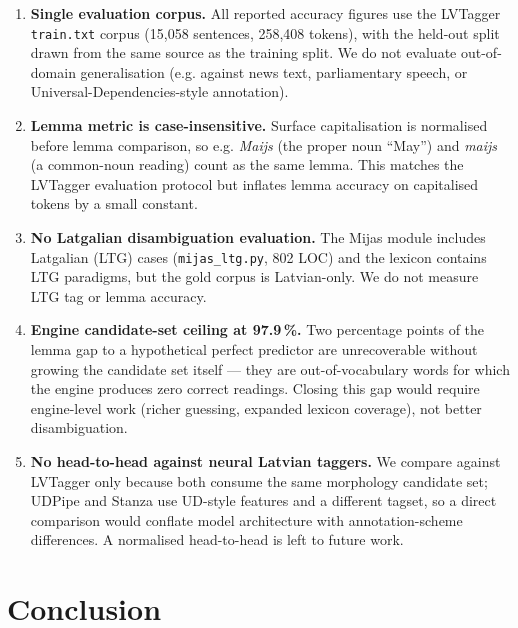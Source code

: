 \documentclass[11pt,a4paper]{article}
\begin{document}
\begin{enumerate}
\item \textbf{Single evaluation corpus.} All reported accuracy figures
  use the LVTagger \texttt{train.txt} corpus (15{,}058 sentences,
  258{,}408 tokens), with the held-out split drawn from the same
  source as the training split. We do not evaluate out-of-domain
  generalisation (e.g. against news text, parliamentary speech, or
  Universal-Dependencies-style annotation).
\item \textbf{Lemma metric is case-insensitive.} Surface capitalisation
  is normalised before lemma comparison, so e.g. \textit{Maijs} (the
  proper noun ``May'') and \textit{maijs} (a common-noun reading)
  count as the same lemma. This matches the LVTagger evaluation
  protocol but inflates lemma accuracy on capitalised tokens by a
  small constant.
\item \textbf{No Latgalian disambiguation evaluation.} The Mijas
  module includes Latgalian (LTG) cases (\texttt{mijas\_ltg.py}, 802
  LOC) and the lexicon contains LTG paradigms, but the gold corpus is
  Latvian-only. We do not measure LTG tag or lemma accuracy.
\item \textbf{Engine candidate-set ceiling at 97.9\,\%.} Two
  percentage points of the lemma gap to a hypothetical perfect
  predictor are unrecoverable without growing the candidate set
  itself --- they are out-of-vocabulary words for which the engine
  produces zero correct readings. Closing this gap would require
  engine-level work (richer guessing, expanded lexicon coverage), not
  better disambiguation.
\item \textbf{No head-to-head against neural Latvian taggers.} We
  compare against LVTagger only because both consume the same
  morphology candidate set; UDPipe \cite{straka2017udpipe} and Stanza
  \cite{qi2020stanza} use UD-style features and a different tagset, so
  a direct comparison would conflate model architecture with
  annotation-scheme differences. A normalised head-to-head is left to
  future work.
\end{enumerate}

\section{Conclusion}
\end{document}
